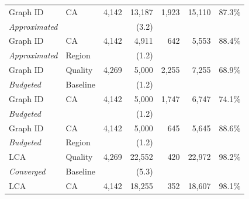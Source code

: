 \begin{table}[!t]
\begin{center}
\begin{tabular}{| l | l | r | r | r | r | r |}
            \hline
            Graph ID              & CA           & 4,142                & 13,187           & 1,923            & 15,110           & 87.3\%              \\
            \textit{Approximated} &              &                      & (3.2)            &                  &                  &                     \\
            \hline
            Graph ID              & CA           & 4,142                & 4,911            & 642              & 5,553            & 88.4\%              \\
            \textit{Approximated} & Region       &                      & (1.2)            &                  &                  &                     \\
            \hline
            \hline
            Graph ID              & Quality      & 4,269                & 5,000            & 2,255            & 7,255            & 68.9\%              \\
            \textit{Budgeted}     & Baseline     &                      & (1.2)            &                  &                  &                     \\
            \hline
            Graph ID              & CA           & 4,142                & 5,000            & 1,747            & 6,747            & 74.1\%              \\
            \textit{Budgeted}     &              &                      & (1.2)            &                  &                  &                     \\
            \hline
            Graph ID              & CA           & 4,142                & 5,000            & 645              & 5,645            & 88.6\%              \\
            \textit{Budgeted}     & Region       &                      & (1.2)            &                  &                  &                     \\
            \hline
            \hline
            LCA                   & Quality      & 4,269                & 22,552           & 420              & 22,972           & 98.2\%              \\
            \textit{Converged}    & Baseline     &                      & (5.3)            &                  &                  &                     \\
            \hline
            LCA                   & CA           & 4,142                & 18,255           & 352              & 18,607           & 98.1\%              \\

\end{tabular}
\end{center}
\end{table}
